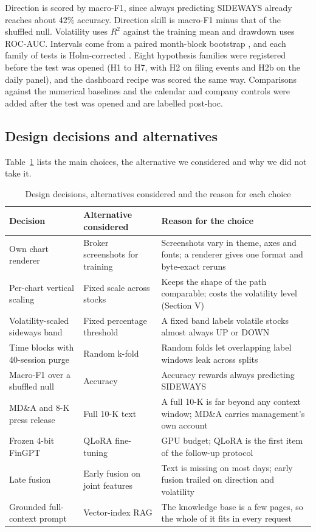 \documentclass[conference]{IEEEtran}
\begin{document}
Direction is scored by macro-F1, since always predicting SIDEWAYS already reaches about 42\% accuracy. Direction skill is macro-F1 minus that of the shuffled null. Volatility uses $R^2$ against the training mean and drawdown uses ROC-AUC. Intervals come from a paired month-block bootstrap \cite{kunsch1989}, and each family of tests is Holm-corrected \cite{holm1979}. Eight hypothesis families were registered before the test was opened (H1 to H7, with H2 on filing events and H2b on the daily panel), and the dashboard recipe was scored the same way. Comparisons against the numerical baselines and the calendar and company controls were added after the test was opened and are labelled post-hoc.

\subsection{Design decisions and alternatives}

Table~\ref{tab:alts} lists the main choices, the alternative we considered and why we did not take it.

\begin{table}[t]
\caption{Design decisions, alternatives considered and the reason for each choice}
\label{tab:alts}
\centering
\begin{tabular}{lll}
\toprule
Decision & Alternative considered & Reason for the choice \\
\midrule
Own chart renderer & Broker screenshots for training & Screenshots vary in theme, axes and fonts; a renderer gives one format and byte-exact reruns \\
Per-chart vertical scaling & Fixed scale across stocks & Keeps the shape of the path comparable; costs the volatility level (Section V) \\
Volatility-scaled sideways band & Fixed percentage threshold & A fixed band labels volatile stocks almost always UP or DOWN \\
Time blocks with 40-session purge & Random k-fold & Random folds let overlapping label windows leak across splits \\
Macro-F1 over a shuffled null & Accuracy & Accuracy rewards always predicting SIDEWAYS \\
MD\&A and 8-K press release & Full 10-K text & A full 10-K is far beyond any context window; MD\&A carries management's own account \\
Frozen 4-bit FinGPT & QLoRA fine-tuning & GPU budget; QLoRA is the first item of the follow-up protocol \\
Late fusion & Early fusion on joint features & Text is missing on most days; early fusion trailed on direction and volatility \\
Grounded full-context prompt & Vector-index RAG & The knowledge base is a few pages, so the whole of it fits in every request \\
\bottomrule
\end{tabular}
\end{table}
\end{document}
